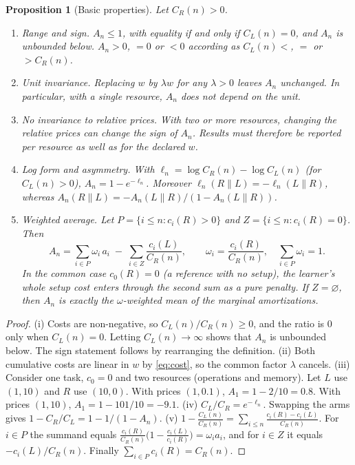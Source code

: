 \documentclass[11pt]{article}
\newtheorem{proposition}{Proposition}
\theoremstyle{remark}
\begin{document}
\begin{proposition}[Basic properties]\label{prop:basic}
Let $C_R(n)>0$.
\begin{enumerate}[label=(\roman*),itemsep=1pt]
\item \emph{Range and sign.} $A_n\le 1$, with equality if and only if $C_L(n)=0$, and $A_n$ is unbounded below. $A_n>0$, $=0$ or $<0$ according as $C_L(n)<$, $=$ or $>C_R(n)$.
\item \emph{Unit invariance.} Replacing $w$ by $\lambda w$ for any $\lambda>0$ leaves $A_n$ unchanged. In particular, with a single resource, $A_n$ does not depend on the unit.
\item \emph{No invariance to relative prices.} With two or more resources, changing the \emph{relative} prices can change the sign of $A_n$. Results must therefore be reported per resource as well as for the declared $w$.
\item \emph{Log form and asymmetry.} With $\ell_n = \log C_R(n) - \log C_L(n)$ (for $C_L(n)>0$), $A_n = 1-e^{-\ell_n}$. Moreover $\ell_n(R\|L)=-\ell_n(L\|R)$, whereas $A_n(R\|L) = -A_n(L\|R)/(1-A_n(L\|R))$.
\item \emph{Weighted average.} Let $P=\{i\le n: c_i(R)>0\}$ and $Z=\{i\le n: c_i(R)=0\}$. Then
\begin{equation}\label{eq:wavg}
A_n = \sum_{i\in P}\omega_i\, a_i \;-\; \sum_{i\in Z}\frac{c_i(L)}{C_R(n)},\qquad \omega_i = \frac{c_i(R)}{C_R(n)},\quad \sum_{i\in P}\omega_i = 1 .
\end{equation}
In the common case $c_0(R)=0$ (a reference with no setup), the learner's whole setup cost enters through the second sum as a pure penalty. If $Z=\varnothing$, then $A_n$ is exactly the $\omega$-weighted mean of the marginal amortizations.
\end{enumerate}
\end{proposition}
\begin{proof}
(i) Costs are non-negative, so $C_L(n)/C_R(n)\ge 0$, and the ratio is $0$ only when $C_L(n)=0$. Letting $C_L(n)\to\infty$ shows that $A_n$ is unbounded below. The sign statement follows by rearranging the definition.
(ii) Both cumulative costs are linear in $w$ by \eqref{eq:cost}, so the common factor $\lambda$ cancels.
(iii) Consider one task, $c_0=0$ and two resources (operations and memory). Let $L$ use $(1,10)$ and $R$ use $(10,0)$. With prices $(1,0.1)$, $A_1 = 1-2/10 = 0.8$. With prices $(1,10)$, $A_1 = 1-101/10 = -9.1$.
(iv) $C_L/C_R = e^{-\ell_n}$. Swapping the arms gives $1-C_R/C_L = 1-1/(1-A_n)$.
(v) $1-\frac{C_L(n)}{C_R(n)} = \sum_{i\le n} \frac{c_i(R)-c_i(L)}{C_R(n)}$. For $i\in P$ the summand equals $\frac{c_i(R)}{C_R(n)}\bigl(1-\frac{c_i(L)}{c_i(R)}\bigr)=\omega_i a_i$, and for $i\in Z$ it equals $-c_i(L)/C_R(n)$. Finally $\sum_{i\in P}c_i(R)=C_R(n)$.
\end{proof}
\end{document}
